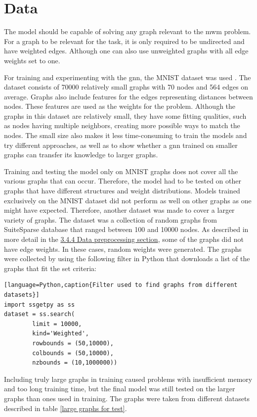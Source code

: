 \section{Data}
\label{sec:dataanalysis}
The model should be capable of solving any graph relevant to the \gls{mwm} problem. For a graph to be relevant for the task, it is only required to be undirected and have weighted edges. Although one can also use unweighted graphs with all edge weights set to one.

For training and experimenting with the \gls{gnn}, the MNIST dataset was used \cite{dwivedi2022benchmarking}. The dataset consists of 70000 relatively small graphs with 70 nodes and 564 edges on average. Graphs also include features for the edges representing distances between nodes. These features are used as the weights for the problem. Although the graphs in this dataset are relatively small, they have some fitting qualities, such as nodes having multiple neighbors, creating more possible ways to match the nodes. The small size also makes it less time-consuming to train the models and try different approaches, as well as to show whether a \gls{gnn} trained on smaller graphs can transfer its knowledge to larger graphs.

Training and testing the model only on MNIST graphs does not cover all the various graphs that can occur. Therefore, the model had to be tested on other graphs that have different structures and weight distributions. Models trained exclusively on the MNIST dataset did not perform as well on other graphs as one might have expected. Therefore, another dataset was made to cover a larger variety of graphs. The dataset was a collection of random graphs from SuiteSparse database that ranged between 100 and 10000 nodes. As described in more detail in the \hyperref[sec:preprocessing]{3.4.4 Data preprocessing section}, some of the graphs did not have edge weights. In these cases, random weights were generated. The graphs were collected by using the following filter in Python that downloads a list of the graphs that fit the set criteria:

\begin{lstlisting}[language=Python,caption{Filter used to find graphs from different datasets}]
import ssgetpy as ss
dataset = ss.search( 
		limit = 10000,
		kind='Weighted',
		rowbounds = (50,10000),
		colbounds = (50,10000),
		nzbounds = (10,1000000))
\end{lstlisting}

Including truly large graphs in training caused problems with insufficient memory and too long training time, but the final model was still tested on the larger graphs than ones used in training. The graphs were taken from different datasets described in table \ref{large graphs for test}.

